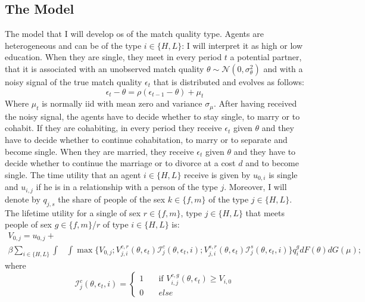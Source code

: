 \documentclass[12pt]{article}
\begin{document}
\subsection{The Model}
The model that I will develop os of the match quality type. Agents are heterogeneous and can be of the type $i \in \{H,L\}$: I will interpret it as high or low education. When they are single, they meet in every period $t$ a potential partner, that it is associated with an unobserved match quality $\theta\sim\mathcal{N}(0,\sigma_\theta^2)$ and with a noisy signal of the true match quality $\epsilon_t$ that is distributed and evolves as follows:
\begin{equation}
\epsilon_t-\theta=\rho(\epsilon_{t-1}-\theta)+\mu_t
\end{equation}
Where $\mu_t$ is normally iid with mean zero and variance $\sigma_{\mu}$. After having received the noisy signal, the agents have to decide whether to stay single, to marry or to cohabit. If they are cohabiting, in every period they receive $\epsilon_t$ given $\theta$ and they have to decide whether to continue cohabitation, to marry or to separate and become single. When they are married, they  receive $\epsilon_t$ given $\theta$ and they have to decide whether to continue the marriage or to divorce at a cost $d$ and to become single. The time utility that an agent  $i \in \{H,L\}$ receive is given by $u_{0,i}$ is single and $u_{i,j}$ if he is in a relationship with a person of the type $j$. Moreover, I will denote by $q_{j,s}$ the share of people of the sex $k\in\{f,m\}$ of the type $j \in \{H,L\}$.\\
The lifetime utility for a single of sex $r\in\{f,m\}$, type $j\in\{H,L\}$ that meets people of sex  $g\in\{f,m\}$/$r$ of type  $i\in\{H,L\}$ is:
\begin{equation}\label{eq:vsi}
\begin{split}
V_{0,j}=u_{0,j}+ \\ \beta\sum_{i\in \{H,L\}}\int&\int\max\bigg\{V_{0,j};V^{c,r}_{j,i}(\theta,\epsilon_t)\mathcal{I}_j^c(\theta,\epsilon_t,i);V^{s,r}_{j,i}(\theta,\epsilon_t)\mathcal{I}_j^s(\theta,\epsilon_t,i)\bigg\}q^{g}_i dF(\theta)dG(\mu);
\end{split}
\end{equation}
where
\begin{equation}
\mathcal{I}^c_j(\theta,\epsilon_t,i)=
\begin{cases}
1       & \quad \text{if }V^{c,g}_{i,j}(\theta,\epsilon_t) \geq V_{i,0}\\
0  & \quad else
\end{cases}
\end{equation}
\end{document}
